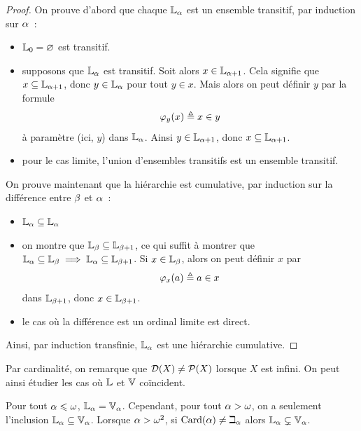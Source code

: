 \begin{proof}
  On prouve d'abord que chaque $\mathbb L_{\alpha}$ est un ensemble transitif, par induction
  sur $\alpha$~:
  \begin{itemize}
  \item $\mathbb L_0 = \varnothing$ est transitif.
  \item supposons que $\mathbb L_{\alpha}$ est transitif. Soit alors
    $x \in \mathbb L_{\alpha + 1}$. Cela signifie que
    $x\subseteq \mathbb L_{\alpha + 1}$, donc $y \in \mathbb L_\alpha$ pour tout
    $y \in x$. Mais alors on peut définir $y$ par la formule
    \[\varphi_y(x) \triangleq x \in y\]
    à paramètre (ici, $y$) dans $\mathbb L_{\alpha}$. Ainsi $y \in \mathbb L_{\alpha + 1}$, donc
    $x \subseteq \mathbb L_{\alpha + 1}$.
  \item pour le cas limite, l'union d'ensembles transitifs est un ensemble
    transitif.
  \end{itemize}

  On prouve maintenant que la hiérarchie est cumulative, par induction sur
  la différence entre $\beta$ et $\alpha$~:
  \begin{itemize}
  \item $\mathbb L_{\alpha} \subseteq \mathbb L_\alpha$
  \item on montre que $\mathbb L_{\beta}\subseteq \mathbb L_{\beta + 1}$, ce qui suffit à
    montrer que
    $\mathbb L_{\alpha} \subseteq \mathbb L_\beta \implies \mathbb L_\alpha \subseteq \mathbb L_{\beta + 1}$.
    Si $x \in \mathbb L_{\beta}$, alors on peut définir $x$ par
    \[\varphi_x(a) \triangleq a \in x\]
    dans $\mathbb L_{\beta + 1}$, donc $x \in \mathbb L_{\beta + 1}$.
  \item le cas où la différence est un ordinal limite est direct.
  \end{itemize}
  Ainsi, par induction transfinie, $\mathbb L_{\alpha}$ est une hiérarchie
  cumulative.
\end{proof}

Par cardinalité, on remarque que $\mathcal{D}(X)\neq \mathcal{P}(X)$ lorsque
$X$ est infini. On peut ainsi étudier les cas où $\mathbb L$ et $\mathbb V$ coïncident.

\begin{proposition}
  Pour tout $\alpha \leqslant \omega$, $\mathbb L_{\alpha} = \mathbb V_{\alpha}$. Cependant, pour tout
  $\alpha > \omega$, on a seulement l'inclusion $\mathbb L_{\alpha} \subseteq \mathbb V_{\alpha}$. Lorsque
  $\alpha > \omega^2$, si $\operatorname{Card}(\alpha) \neq \beth_\alpha$ alors
  $\mathbb L_{\alpha} \subsetneq \mathbb V_{\alpha}$.
\end{proposition}

